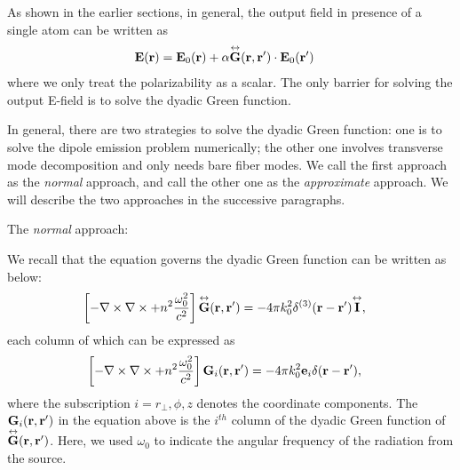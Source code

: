 As shown in the earlier sections, in general, the output field in presence of a single atom can be written as
\begin{align}
\mathbf{E}(\mathbf{r}) 
&=\mathbf{E}_0(\mathbf{r})+\alpha \overset{\leftrightarrow}{\bf G}(\mathbf{r},\mathbf{r}')\cdot \mathbf{E}_0(\mathbf{r}')
\end{align}
where we only treat the polarizability as a scalar. The only barrier for solving the output E-field is to solve the dyadic Green function.

In general, there are two strategies to solve the dyadic Green function: one is to solve the dipole emission problem numerically; the other one involves transverse mode decomposition and only needs bare fiber modes. We call the first approach as the \textit{normal} approach, and call the other one as the \textit{approximate} approach. We will describe the two approaches in the successive paragraphs. 

The \textit{normal} approach:

We recall that the equation governs the dyadic Green function can be written as below:
\begin{align}
\left[ -\nabla\times\nabla\times + n^2\frac{\omega^2_0}{c^2} \right] \overset{\leftrightarrow}{\bf G}(\mathbf{r},\mathbf{r}') &= -4\pi k_0^2\delta^{(3)}(\mathbf{r}-\mathbf{r}')\overset{\leftrightarrow}{\bf I},
\end{align}
each column of which can be expressed as
\begin{align}
\left[ -\nabla\times\nabla\times + n^2\frac{\omega^2_0}{c^2} \right] \mathbf{G}_i(\br,\br') &= -4\pi k_0^2\mathbf{e}_i\delta(\br-\br'), \label{eq:Gi}
\end{align}
where the subscription $ i=r\!_\perp,\phi,z $ denotes the coordinate components. The $ \mathbf{G}_i(\mathbf{r},\mathbf{r}') $ in the equation above is the $ i^{th} $ column of the dyadic Green function of $ \overset{\leftrightarrow}{\bf G}(\mathbf{r},\mathbf{r}') $. Here, we used $\omega_0$ to indicate the angular frequency of the radiation from the source.  


